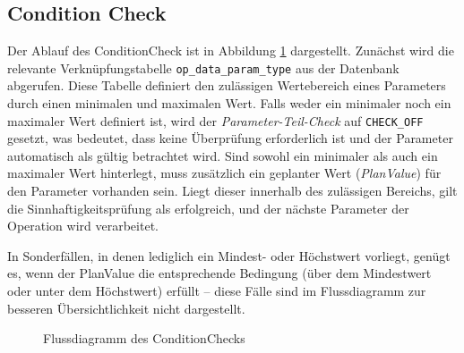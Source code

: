 \subsection{Condition Check}



Der Ablauf des \gls{ConditionCheck} ist in Abbildung \ref{fig:condition-check} dargestellt. Zunächst wird die relevante Verknüpfungstabelle \texttt{op\_data\_param\_type} aus der Datenbank abgerufen. Diese Tabelle definiert den zulässigen Wertebereich eines Parameters durch einen minimalen und maximalen Wert. Falls weder ein minimaler noch ein maximaler Wert definiert ist, wird der \textit{Parameter-Teil-Check} auf \texttt{CHECK\_OFF} gesetzt, was bedeutet, dass keine Überprüfung erforderlich ist und der Parameter automatisch als gültig betrachtet wird. Sind sowohl ein minimaler als auch ein maximaler Wert hinterlegt, muss zusätzlich ein geplanter Wert (\textit{PlanValue}) für den Parameter vorhanden sein. Liegt dieser innerhalb des zulässigen Bereichs, gilt die Sinnhaftigkeitsprüfung als erfolgreich, und der nächste Parameter der Operation wird verarbeitet. 

In Sonderfällen, in denen lediglich ein Mindest- oder Höchstwert vorliegt, genügt es, wenn der PlanValue die entsprechende Bedingung (über dem Mindestwert oder unter dem Höchstwert) erfüllt – diese Fälle sind im Flussdiagramm zur besseren Übersichtlichkeit nicht dargestellt.

\begin{figure}[!htb]
    \centering
    \caption{Flussdiagramm des \gls{ConditionCheck}s}
    \label{fig:condition-check}
\end{figure}


